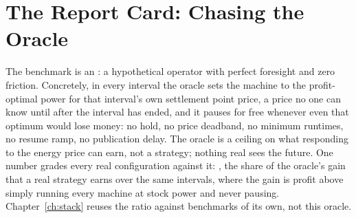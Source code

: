 \section{The Report Card: Chasing the Oracle}
\label{sec:oracle}

The benchmark is an : a hypothetical operator with perfect foresight and zero friction. Concretely, in every interval the oracle sets the machine to the profit-optimal power for that interval's own settlement point price, a price no one can know until after the interval has ended, and it pauses for free whenever even that optimum would lose money: no hold, no price deadband, no minimum runtimes, no resume ramp, no publication delay. %
The oracle is a ceiling on what responding to the energy price can earn, not a strategy; nothing real sees the future. One number grades every real configuration against it: , the share of the oracle's gain that a real strategy earns over the same intervals, where the gain is profit above simply running every machine at stock power and never pausing. Chapter~\ref{ch:stack} reuses the ratio against benchmarks of its own, not this oracle. %
